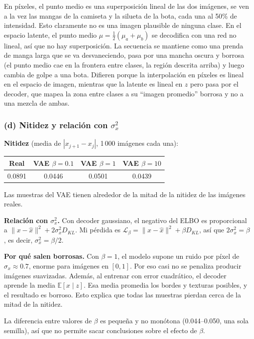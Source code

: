 \documentclass[11pt]{article}
\begin{document}
En píxeles, el punto medio es una superposición lineal de las dos imágenes, se ven a la vez las mangas de la camiseta y la silueta de la bota, cada una al 50\% de intensidad. Esto claramente no es una imagen plausible de ninguna clase. En el espacio latente, el punto medio $\mu=\tfrac12(\mu_a+\mu_b)$ se decodifica con una red no lineal, así que no hay superposición. La secuencia se mantiene como una prenda de manga larga que se va desvaneciendo, pasa por una mancha oscura y borrosa (el punto medio cae en la frontera entre clases, la región descrita arriba) y luego cambia de golpe a una bota. Difieren porque la interpolación en píxeles es lineal en el espacio de imagen, mientras que la latente es lineal en $z$ pero pasa por el decoder, que mapea la zona entre clases a su ``imagen promedio'' borrosa y no a una mezcla de ambas.

\subsubsection*{(d) Nitidez y relación con $\sigma_x^2$}
\textbf{Nitidez} (media de $|x_{j+1}-x_j|$, 1\,000 imágenes cada una):
\begin{table}[H]
\centering
\begin{tabular}{cccc}
\toprule
Real & VAE $\beta=0.1$ & VAE $\beta=1$ & VAE $\beta=10$ \\
\midrule
0.0891 & 0.0446 & 0.0501 & 0.0439 \\
\bottomrule
\end{tabular}
\end{table}

Las muestras del VAE tienen alrededor de la mitad de la nitidez de las imágenes reales.

\textbf{Relación con $\sigma_x^2$.} Con decoder gaussiano, el negativo del ELBO es proporcional a $\|x-\hat x\|^2 + 2\sigma_x^2 D_{KL}$. Mi pérdida es $\mathcal L_\beta=\|x-\hat x\|^2+\beta D_{KL}$, así que $2\sigma_x^2=\beta$, es decir, $\sigma_x^2=\beta/2$.

\textbf{Por qué salen borrosas.} Con $\beta=1$, el modelo supone un ruido por píxel de $\sigma_x\approx0.7$, enorme para imágenes en $[0,1]$. Por eso casi no se penaliza producir imágenes suavizadas. Además, al entrenar con error cuadrático, el decoder aprende la media $\mathbb E[x\mid z]$. Esa media promedia los bordes y texturas posibles, y el resultado es borroso. Esto explica que todas las muestras pierdan cerca de la mitad de la nitidez.

La diferencia entre valores de $\beta$ es pequeña y no monótona (0.044--0.050, una sola semilla), así que no permite sacar conclusiones sobre el efecto de $\beta$.
\end{document}

